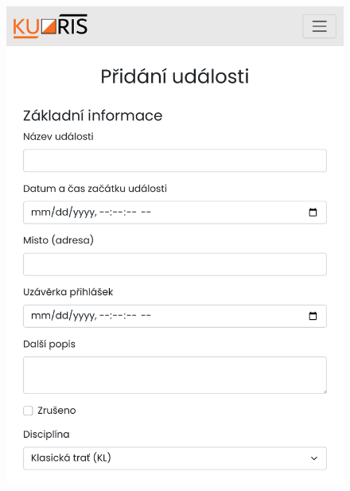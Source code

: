 \begin{figure}[h]
\begin{minipage}[b]{0.48\linewidth}
        \includegraphics[width=\linewidth]{images/form-responsive-layout.pdf}
    \end{minipage}
\end{figure}
